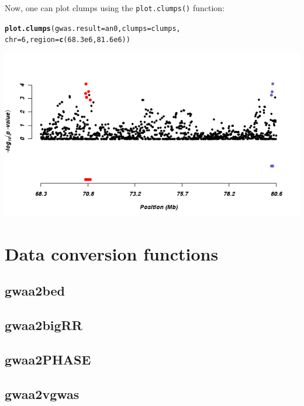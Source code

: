 \documentclass[12pt,a4paper,oneside]{article}\usepackage[]{graphicx}\usepackage[]{color}
\makeatletter
\newcommand{\hlnum}[1]{\textcolor[rgb]{0.686,0.059,0.569}{#1}}%
\newcommand{\hlstd}[1]{\textcolor[rgb]{0.345,0.345,0.345}{#1}}%
\newcommand{\hlkwc}[1]{\textcolor[rgb]{0.333,0.667,0.333}{#1}}%
\newcommand{\hlkwd}[1]{\textcolor[rgb]{0.737,0.353,0.396}{\textbf{#1}}}%
\newenvironment{kframe}{%
 \def\at@end@of@kframe{}%
 \ifinner\ifhmode%
  \def\at@end@of@kframe{\end{minipage}}%
  \begin{minipage}{\columnwidth}%
 \fi\fi%
 \def\FrameCommand##1{\hskip\@totalleftmargin \hskip-\fboxsep
 \colorbox{shadecolor}{##1}\hskip-\fboxsep
     \hskip-\linewidth \hskip-\@totalleftmargin \hskip\columnwidth}%
 \MakeFramed {\advance\hsize-\width
   \@totalleftmargin\z@ \linewidth\hsize
   \@setminipage}}%
 {\par\unskip\endMakeFramed%
 \at@end@of@kframe}
\newenvironment{knitrout}{}{} %
\makeatother
\begin{document}
Now, one can plot clumps using the \texttt{plot.clumps()} function:
\begin{knitrout}\footnotesize
{}\color{fgcolor}\begin{kframe}
\begin{alltt}
\hlkwd{plot.clumps}\hlstd{(}\hlkwc{gwas.result} \hlstd{= an0,} \hlkwc{clumps} \hlstd{= clumps,}
            \hlkwc{chr} \hlstd{=} \hlnum{6}\hlstd{,} \hlkwc{region} \hlstd{=} \hlkwd{c}\hlstd{(}\hlnum{68.3e6}\hlstd{,} \hlnum{81.6e6}\hlstd{))}
\end{alltt}
\end{kframe}

{\centering \includegraphics[width=1.0\textwidth]{images/plot_clumps} 

}



\end{knitrout}

\section*{Data conversion functions}
\subsection*{gwaa2bed}
\subsection*{gwaa2bigRR}
\subsection*{gwaa2PHASE}
\subsection*{gwaa2vgwas}
\end{document}
